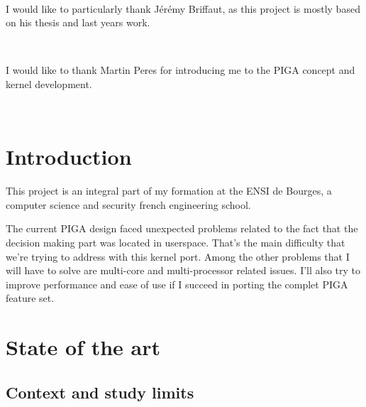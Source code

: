 \documentclass[pdftex,a4paper,titlepage,11pt]{article}
\begin{document}
~

I would like to particularly thank Jérémy Briffaut, as this project is mostly based on his thesis and last years work.

~

I would like to thank Martin Peres for introducing me to the PIGA concept and kernel development.

~

\newpage

\tableofcontents

\newpage

\listoffigures

\newpage

\section*{Introduction} 

This project is an integral part of my formation at the ENSI de Bourges, a computer science and security french engineering school.

The current PIGA design faced unexpected problems related to the fact that the decision making part was located in userspace. That's the main difficulty that we're trying to address with this kernel port. Among the other problems that I will have to solve are multi-core and multi-processor related issues. I'll also try to improve performance and ease of use if I succeed in porting the complet PIGA feature set.


%
%

\newpage

\section{State of the art}

\subsection{Context and study limits}
\end{document}
